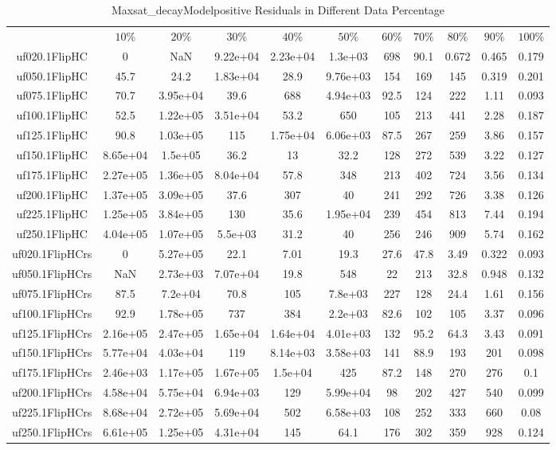 \begin{table}[htbp]
\caption{Maxsat_decayModelpositive Residuals in Different Data Percentage}
\centering
\begin{tabular}{|ccccccccccc|}
\hline
 & $10\%$ & $20\%$ & $30\%$ & $40\%$ & $50\%$ & $60\%$ & $70\%$ & $80\%$ & $90\%$ & $100\%$ \\
uf020.1FlipHC &    0 & NaN & 9.22e+04 & 2.23e+04 & 1.3e+03 &  698 & 90.1 & 0.672 & 0.465 & 0.179 \\
uf050.1FlipHC & 45.7 & 24.2 & 1.83e+04 & 28.9 & 9.76e+03 &  154 &  169 &  145 & 0.319 & 0.201 \\
uf075.1FlipHC & 70.7 & 3.95e+04 & 39.6 &  688 & 4.94e+03 & 92.5 &  124 &  222 & 1.11 & 0.093 \\
uf100.1FlipHC & 52.5 & 1.22e+05 & 3.51e+04 & 53.2 &  650 &  105 &  213 &  441 & 2.28 & 0.187 \\
uf125.1FlipHC & 90.8 & 1.03e+05 &  115 & 1.75e+04 & 6.06e+03 & 87.5 &  267 &  259 & 3.86 & 0.157 \\
uf150.1FlipHC & 8.65e+04 & 1.5e+05 & 36.2 &   13 & 32.2 &  128 &  272 &  539 & 3.22 & 0.127 \\
uf175.1FlipHC & 2.27e+05 & 1.36e+05 & 8.04e+04 & 57.8 &  348 &  213 &  402 &  724 & 3.56 & 0.134 \\
uf200.1FlipHC & 1.37e+05 & 3.09e+05 & 37.6 &  307 &   40 &  241 &  292 &  726 & 3.38 & 0.126 \\
uf225.1FlipHC & 1.25e+05 & 3.84e+05 &  130 & 35.6 & 1.95e+04 &  239 &  454 &  813 & 7.44 & 0.194 \\
uf250.1FlipHC & 4.04e+05 & 1.07e+05 & 5.5e+03 & 31.2 &   40 &  256 &  246 &  909 & 5.74 & 0.162 \\
uf020.1FlipHCrs &    0 & 5.27e+05 & 22.1 & 7.01 & 19.3 & 27.6 & 47.8 & 3.49 & 0.322 & 0.093 \\
uf050.1FlipHCrs & NaN & 2.73e+03 & 7.07e+04 & 19.8 &  548 &   22 &  213 & 32.8 & 0.948 & 0.132 \\
uf075.1FlipHCrs & 87.5 & 7.2e+04 & 70.8 &  105 & 7.8e+03 &  227 &  128 & 24.4 & 1.61 & 0.156 \\
uf100.1FlipHCrs & 92.9 & 1.78e+05 &  737 &  384 & 2.2e+03 & 82.6 &  102 &  105 & 3.37 & 0.096 \\
uf125.1FlipHCrs & 2.16e+05 & 2.47e+05 & 1.65e+04 & 1.64e+04 & 4.01e+03 &  132 & 95.2 & 64.3 & 3.43 & 0.091 \\
uf150.1FlipHCrs & 5.77e+04 & 4.03e+04 &  119 & 8.14e+03 & 3.58e+03 &  141 & 88.9 &  193 &  201 & 0.098 \\
uf175.1FlipHCrs & 2.46e+03 & 1.17e+05 & 1.67e+05 & 1.5e+04 &  425 & 87.2 &  148 &  270 &  276 &  0.1 \\
uf200.1FlipHCrs & 4.58e+04 & 5.75e+04 & 6.94e+03 &  129 & 5.99e+04 &   98 &  202 &  427 &  540 & 0.099 \\
uf225.1FlipHCrs & 8.68e+04 & 2.72e+05 & 5.69e+04 &  502 & 6.58e+03 &  108 &  252 &  333 &  660 & 0.08 \\
uf250.1FlipHCrs & 6.61e+05 & 1.25e+05 & 4.31e+04 &  145 & 64.1 &  176 &  302 &  359 &  928 & 0.124 \\
\hline
\end{tabular}
\end{table}
